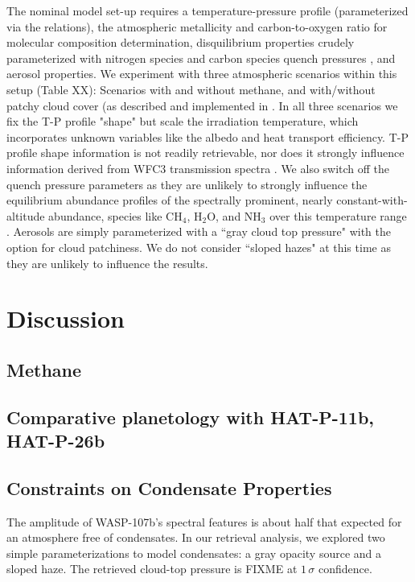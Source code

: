 \documentclass[twocolumn]{aastex61}
\begin{document}
The nominal model set-up requires a temperature-pressure profile (parameterized via the \citealt{guillot10} relations), the atmospheric metallicity and carbon-to-oxygen ratio for molecular composition determination, disquilibrium properties crudely parameterized with nitrogen species and carbon species quench pressures \citep{morley17}, and aerosol properties.  We experiment with three atmospheric scenarios within this setup (Table XX):  Scenarios with and without methane, and with/without patchy cloud cover (as described and implemented in \citealt{line16}.  In all three scenarios we fix the T-P profile "shape" but scale the irradiation temperature, which incorporates unknown variables like the albedo and heat transport efficiency.  T-P profile shape information is not readily retrievable, nor does it strongly influence information derived from WFC3 transmission spectra \citep[e.g.][]{kreidberg15}. We also switch off the quench pressure parameters as they are unlikely to strongly influence the equilibrium abundance profiles of the spectrally prominent, nearly constant-with-altitude abundance, species like CH$_4$, H$_2$O, and NH$_3$ over this temperature range \citep[e.g.][]{line11, moses13}.  Aerosols are simply parameterized with a ``gray cloud top pressure" with the option for cloud patchiness. We do not consider ``sloped hazes" at this time as they are unlikely to influence the results.

\section{Discussion} \label{sec:discuss}

\subsection{Methane}

\subsection{Comparative planetology with HAT-P-11b, HAT-P-26b}

\subsection{Constraints on Condensate Properties}
The amplitude of WASP-107b's spectral features is about half that expected for an atmosphere free of condensates. In our retrieval analysis, we explored two simple parameterizations to model condensates: a gray opacity source and a sloped haze.  The retrieved cloud-top pressure is FIXME at $1\,\sigma$ confidence.
\end{document}
